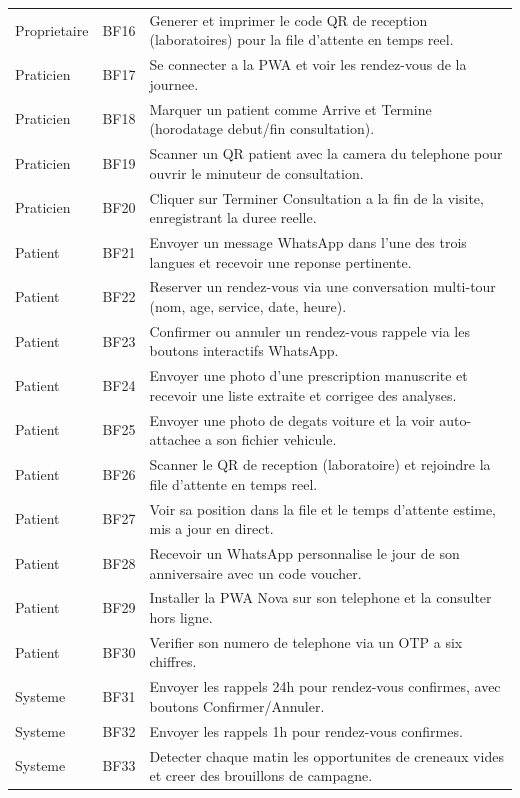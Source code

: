 \begin{table}[H]
\begin{tabular}{p{2.4cm}p{1.2cm}p{9.8cm}}
    Proprietaire & BF16 & Generer et imprimer le code QR de reception (laboratoires) pour la file d'attente en temps reel. \\
    Praticien & BF17 & Se connecter a la PWA et voir les rendez-vous de la journee. \\
    Praticien & BF18 & Marquer un patient comme Arrive et Termine (horodatage debut/fin consultation). \\
    Praticien & BF19 & Scanner un QR patient avec la camera du telephone pour ouvrir le minuteur de consultation. \\
    Praticien & BF20 & Cliquer sur Terminer Consultation a la fin de la visite, enregistrant la duree reelle. \\
    Patient & BF21 & Envoyer un message WhatsApp dans l'une des trois langues et recevoir une reponse pertinente. \\
    Patient & BF22 & Reserver un rendez-vous via une conversation multi-tour (nom, age, service, date, heure). \\
    Patient & BF23 & Confirmer ou annuler un rendez-vous rappele via les boutons interactifs WhatsApp. \\
    Patient & BF24 & Envoyer une photo d'une prescription manuscrite et recevoir une liste extraite et corrigee des analyses. \\
    Patient & BF25 & Envoyer une photo de degats voiture et la voir auto-attachee a son fichier vehicule. \\
    Patient & BF26 & Scanner le QR de reception (laboratoire) et rejoindre la file d'attente en temps reel. \\
    Patient & BF27 & Voir sa position dans la file et le temps d'attente estime, mis a jour en direct. \\
    Patient & BF28 & Recevoir un WhatsApp personnalise le jour de son anniversaire avec un code voucher. \\
    Patient & BF29 & Installer la PWA Nova sur son telephone et la consulter hors ligne. \\
    Patient & BF30 & Verifier son numero de telephone via un OTP a six chiffres. \\
    Systeme & BF31 & Envoyer les rappels 24h pour rendez-vous confirmes, avec boutons Confirmer/Annuler. \\
    Systeme & BF32 & Envoyer les rappels 1h pour rendez-vous confirmes. \\
    Systeme & BF33 & Detecter chaque matin les opportunites de creneaux vides et creer des brouillons de campagne. \\

\end{tabular}
\end{table}

